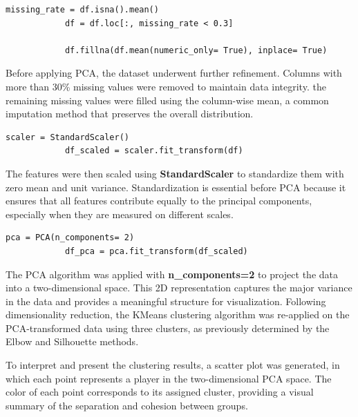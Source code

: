 \documentclass[a4paper,12pt]{article}
\begin{document}
\begin{itemize}[label= {*}, leftmargin= 1cm]
\begin{itemize}[label= {}, leftmargin= 1cm]
        \begin{Verbatim}[xleftmargin= -1cm]
            missing_rate = df.isna().mean()
            df = df.loc[:, missing_rate < 0.3]
            
            df.fillna(df.mean(numeric_only= True), inplace= True)
        \end{Verbatim}  
        \vspace{0.3cm}
        Before applying PCA, the dataset underwent further refinement. Columns with more than 30\% missing values were removed to maintain data integrity. the remaining missing values were filled using the column-wise mean, a common imputation method that preserves the overall distribution. 
        \vspace{0.3cm}

        \begin{Verbatim}[xleftmargin= -1cm]
            scaler = StandardScaler()
            df_scaled = scaler.fit_transform(df)
        \end{Verbatim}
        The features were then scaled using \textbf{StandardScaler} to standardize them with zero mean and unit variance. Standardization is essential before PCA because it ensures that all features contribute equally to the principal components, especially when they are measured on different scales.
        \vspace{0.3cm}

        \begin{Verbatim}[xleftmargin= -1cm]
            pca = PCA(n_components= 2)
            df_pca = pca.fit_transform(df_scaled)
        \end{Verbatim}
        \vspace{0.3cm}

        The PCA algorithm was applied with \textbf{n\_components=2} to project the data into a two-dimensional space. This 2D representation captures the major variance in the data and provides a meaningful structure for visualization. Following dimensionality reduction, the KMeans clustering algorithm was re-applied on the PCA-transformed data using three clusters, as previously determined by the Elbow and Silhouette methods.
        \vspace{0.3cm}

        To interpret and present the clustering results, a scatter plot was generated, in which each point represents a player in the two-dimensional PCA space. The color of each point corresponds to its assigned cluster, providing a visual summary of the separation and cohesion between groups. 
        \newpage
        

\end{itemize}
\end{itemize}
\end{document}
